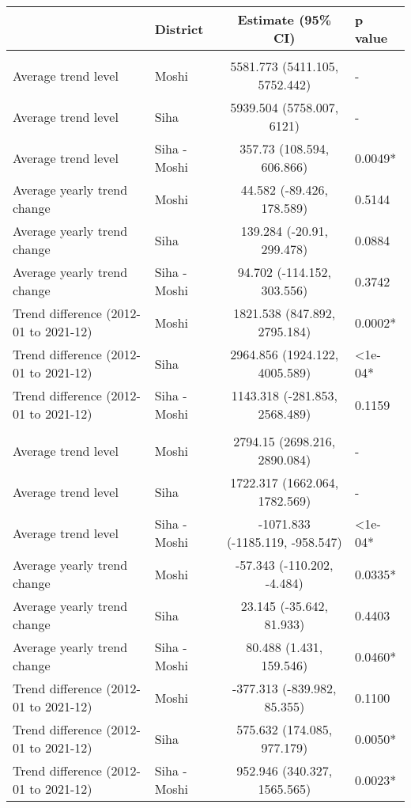 \begingroup
\fontsize{12.0pt}{14.4pt}\selectfont
\begin{longtable}{l|lcl}
\toprule
 & District & Estimate (95\% CI) & p value \\ 
\midrule\addlinespace[2.5pt]
\multicolumn{4}{l}{Infectious/Communicable Diseases} \\[2.5pt] 
\midrule\addlinespace[2.5pt]
Average trend level & Moshi & 5581.773 (5411.105, 5752.442) & - \\ 
Average trend level & Siha & 5939.504 (5758.007, 6121) & - \\ 
Average trend level & Siha - Moshi & 357.73 (108.594, 606.866) & 0.0049* \\ 
Average yearly trend change & Moshi & 44.582 (-89.426, 178.589) & 0.5144 \\ 
Average yearly trend change & Siha & 139.284 (-20.91, 299.478) & 0.0884 \\ 
Average yearly trend change & Siha - Moshi & 94.702 (-114.152, 303.556) & 0.3742 \\ 
Trend difference (2012-01 to 2021-12) & Moshi & 1821.538 (847.892, 2795.184) & 0.0002* \\ 
Trend difference (2012-01 to 2021-12) & Siha & 2964.856 (1924.122, 4005.589) & <1e-04* \\ 
Trend difference (2012-01 to 2021-12) & Siha - Moshi & 1143.318 (-281.853, 2568.489) & 0.1159 \\ 
\midrule\addlinespace[2.5pt]
\multicolumn{4}{l}{Non-Communicable Diseases} \\[2.5pt] 
\midrule\addlinespace[2.5pt]
Average trend level & Moshi & 2794.15 (2698.216, 2890.084) & - \\ 
Average trend level & Siha & 1722.317 (1662.064, 1782.569) & - \\ 
Average trend level & Siha - Moshi & -1071.833 (-1185.119, -958.547) & <1e-04* \\ 
Average yearly trend change & Moshi & -57.343 (-110.202, -4.484) & 0.0335* \\ 
Average yearly trend change & Siha & 23.145 (-35.642, 81.933) & 0.4403 \\ 
Average yearly trend change & Siha - Moshi & 80.488 (1.431, 159.546) & 0.0460* \\ 
Trend difference (2012-01 to 2021-12) & Moshi & -377.313 (-839.982, 85.355) & 0.1100 \\ 
Trend difference (2012-01 to 2021-12) & Siha & 575.632 (174.085, 977.179) & 0.0050* \\ 
Trend difference (2012-01 to 2021-12) & Siha - Moshi & 952.946 (340.327, 1565.565) & 0.0023* \\ 
\bottomrule
\end{longtable}
\endgroup

